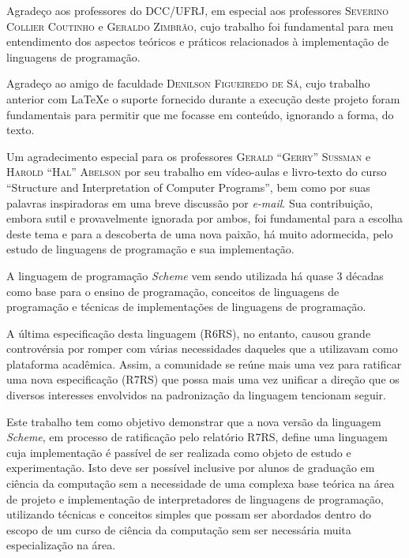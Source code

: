 \documentclass[brazil,pagestart=firstchapter]{abnt}
\begin{document}
Agradeço aos professores do DCC/UFRJ, em especial aos professores 
\textsc{Severino Collier Coutinho} e \textsc{Geraldo Zimbrão}, cujo trabalho foi
fundamental para meu entendimento dos aspectos teóricos e práticos
relacionados à implementação de linguagens de programação.

Agradeço ao amigo de faculdade \textsc{Denilson Figueiredo de Sá}, cujo trabalho 
anterior com \LaTeX e o suporte fornecido durante a execução deste projeto foram
fundamentais para permitir que me focasse em conteúdo, ignorando a forma, do
texto.

Um agradecimento especial para os professores \textsc{Gerald ``Gerry'' Sussman}
e \textsc{Harold ``Hal'' Abelson} por seu trabalho em vídeo-aulas e livro-texto
do curso ``Structure and Interpretation of Computer Programs'', bem como por
suas palavras inspiradoras em uma breve discussão por \textit{e-mail}. Sua
contribuição, embora sutil e provavelmente ignorada por ambos, foi fundamental
para a escolha deste tema e para a descoberta de uma nova paixão, há muito
adormecida, pelo estudo de linguagens de programação e sua implementação.

\begin{resumo}

 A linguagem de programação \textit{Scheme} vem sendo utilizada há quase 3
décadas como base para o ensino de programação, conceitos de linguagens de
programação e técnicas de implementações de linguagens de programação. 

A última especificação desta linguagem (\acs{R6RS}), no entanto, causou grande
controvérsia por romper com várias necessidades daqueles que a utilizavam como
plataforma acadêmica. Assim, a comunidade se reúne mais uma vez para ratificar
uma nova especificação (\acs{R7RS}) que possa mais uma vez unificar a direção
que os diversos interesses envolvidos na padronização da linguagem tencionam
seguir.

Este trabalho tem como objetivo demonstrar que a nova versão da linguagem
\textit{Scheme}, em processo de ratificação pelo relatório \acs{R7RS}, define
uma linguagem cuja implementação é passível de ser realizada como objeto de
estudo e experimentação. Isto deve ser possível inclusive por alunos de
graduação em ciência da computação sem a necessidade de uma complexa base
teórica na área de projeto e implementação de interpretadores de linguagens de
programação, utilizando técnicas e conceitos simples que possam ser abordados
dentro do escopo de um curso de ciência da computação sem ser necessária muita
especialização na área.

\end{resumo}
\end{document}
